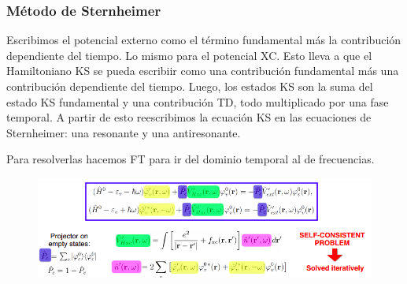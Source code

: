\subsubsection{Método de Sternheimer}

  Escribimos el potencial externo como el término fundamental más la contribución dependiente del tiempo. Lo mismo para el potencial XC. Esto lleva a que el Hamiltoniano KS se pueda escribiir como una contribución fundamental más una contribución dependiente del tiempo. Luego, los estados KS son la suma del estado KS fundamental y una contribución TD, todo multiplicado por una fase temporal. A partir de esto reescribimos la ecuación KS en las ecuaciones de Sternheimer: una resonante y una antiresonante.

    \begin{figure}[H]
        \centering
    \end{figure}

  Para resolverlas hacemos FT para ir del dominio temporal al de frecuencias.
    \begin{figure}[H]
        \centering
        \includegraphics[scale = 0.6]{figs/D6/Stern_4.png}
    \end{figure}

